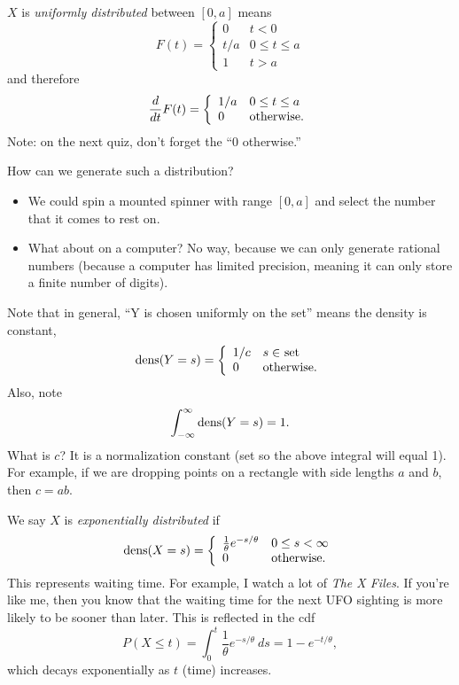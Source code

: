 $X$ is {\em uniformly distributed} between $[0,a]$ means
\[
  F(t) =
	 \left\{ 
	   \begin{array}{ll}
		0 & t<0 \\
		t/a & 0\leq t\leq a\\
		1 & t>a
	   \end{array}
	 \right. 
\]
and therefore
\[
\frac{d}{dt}F(t) = 
	 \left\{ 
	   \begin{array}{ll}
		1/a & 0\leq t\leq a\\
		0 & \mbox{otherwise.}
	   \end{array}
	 \right. 
\]
Note:  on the next quiz, don't forget the ``0 otherwise.''  

How can we generate such a distribution?  
\begin{itemize}
\nolineskips
  \item
We could spin a mounted spinner with range $[0,a]$ and select the number
that it comes to rest on.
  \item
What about on a computer?  
No way, because we can only generate rational numbers (because a computer has
limited precision, meaning it can only store a finite number of digits).
\end{itemize}

Note that 
in general, ``Y is chosen uniformly on the set'' means the density is
constant,
\[
  \mbox{dens}(Y=s) = 
	 \left\{ 
	   \begin{array}{ll}
		1/c & \mbox{$s\in$ set}  \\
		0 & \mbox{otherwise.}
	   \end{array}
	 \right. 
\]
Also, note
\[
  \int_{-\infty}^{\infty} \mbox{dens}(Y=s) = 1.
\]
What is $c$?  It is a normalization constant (set so the above integral
will equal 1). 
For example, if we are dropping points on a rectangle with side lengths $a$
and $b$, then $c = ab$.
\QED

\medskip


\medskip

We say $X$ is {\em exponentially distributed} if
\[
  \mbox{dens}(X=s) = 
	 \left\{ 
	   \begin{array}{ll}
		\frac{1}{\theta} e^{-s/\theta} & 0\leq s<\infty \\
		0 & \mbox{otherwise.}
	   \end{array}
	 \right. 
\]
This represents waiting time.  
For example, I watch a lot of {\em The X Files}.  If you're like me, then
you know that 
the waiting time for the next UFO sighting is more likely to be sooner
than later.
This is reflected in the cdf
\[
  P(X\leq t) = \int_0^t \frac{1}{\theta} e^{-s/\theta}\ ds 
		= 1 - e^{-t/\theta}, 
\]
which decays exponentially as $t$ (time) increases.
\QED

